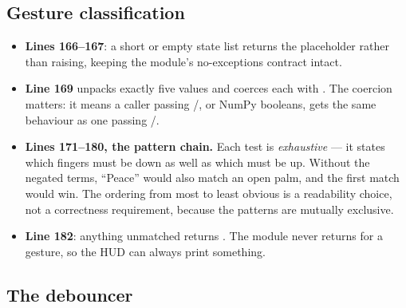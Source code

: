\subsection{Gesture classification}

\begin{codecard}

\end{codecard}

\begin{itemize}
  \item \textbf{Lines 166--167}: a short or empty state list returns the placeholder rather than
        raising, keeping the module's no-exceptions contract intact.
  \item \textbf{Line 169} unpacks exactly five values and coerces each with . The
        coercion matters: it means a caller passing /, or NumPy booleans, gets the
        same behaviour as one passing /.
  \item \textbf{Lines 171--180, the pattern chain.} Each test is \emph{exhaustive} --- it states
        which fingers must be down as well as which must be up. Without the negated terms, ``Peace''
        would also match an open palm, and the first match would win. The ordering from most to least
        obvious is a readability choice, not a correctness requirement, because the patterns are
        mutually exclusive.
  \item \textbf{Line 182}: anything unmatched returns . The module never returns
         for a gesture, so the HUD can always print something.
\end{itemize}

\subsection{The debouncer}

\begin{codecard}

\end{codecard}

